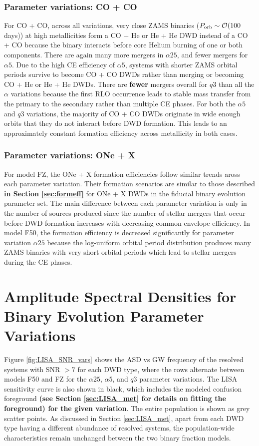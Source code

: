 \documentclass[twocolumn]{aastex631}
\begin{document}
\subsubsection{\textbf{Parameter variations: CO + CO}}\label{formeff_CO_vars}
For CO + CO, across all variations, very close ZAMS binaries ($P_{\rm{orb}}\sim\mathcal{O}(100$ days)) at high metallicities form a CO + He or He + He DWD instead of a CO + CO because the binary interacts before core Helium burning of one or both components. There are again many more mergers in $\alpha25$, and fewer mergers for $\alpha5$. Due to the high CE efficiency of $\alpha5$, systems with shorter ZAMS orbital periods survive to become CO + CO DWDs rather than merging or becoming CO + He or He + He DWDs. There are \textbf{fewer} mergers overall for $q3$ than all the $\alpha$ variations because the first RLO occurrence leads to stable mass transfer from the primary to the secondary rather than multiple CE phases. For both the $\alpha5$ and $q3$ variations, the majority of CO + CO DWDs originate in wide enough orbits that they do not interact before DWD formation. This leads to an approximately constant formation efficiency across metallicity in both cases.

\subsubsection{\textbf{Parameter variations: ONe + X}}\label{formeff_ONe_vars}
For model FZ, the ONe + X formation efficiencies follow similar trends aross each parameter variation. Their formation scenarios are similar to those described \textbf{in Section \ref{sec:formeff}} for ONe + X DWDs in the fiducial binary evolution parameter set. The main difference between each parameter variation is only in the number of sources produced since the number of stellar mergers that occur before DWD formation increases with decreasing common envelope efficiency. In model F50, the formation efficiency is decreased significantly for parameter variation $\alpha25$ because the log-uniform orbital period distribution produces many ZAMS binaries with very short orbital periods which lead to stellar mergers during the CE phases.


\section{Amplitude Spectral Densities for Binary Evolution Parameter Variations}\label{appendix:ASD_vars}

Figure \ref{fig:LISA_SNR_vars} shows the ASD vs GW frequency of the resolved systems with SNR $> 7$ for each DWD type, where the rows alternate between models F50 and FZ for the $\alpha25$, $\alpha5$, and $q3$ parameter variations. The LISA sensitivity curve is also shown in black, which includes the modeled confusion foreground \textbf{(see Section \ref{sec:LISA_met} for details on fitting the foreground) for the given variation}. The entire population is shown as grey scatter points. As discussed in Section \ref{sec:LISA_met}, apart from each DWD type having a different abundance of resolved systems, the population-wide characteristics remain unchanged between the two binary fraction models.
\end{document}
